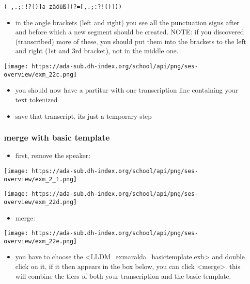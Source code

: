 \documentclass[
  12pt,
]{article}
\providecommand{\tightlist}{%
  \setlength{\itemsep}{0pt}\setlength{\parskip}{0pt}}
\begin{document}
\texttt{(\ \textbar{}{[},.;:!?(){]}\textbar{}{[}a-zäöüß{]}(?={[},.;:?!(){]}))}

\begin{itemize}
\tightlist
\item
  in the angle brackets (left and right) you see all the punctuation
  signs after and before which a new segment should be created. NOTE: if
  you discovered (transcribed) more of these, you should put them into
  the brackets to the left and right (1st and 3rd bracket), not in the
  middle one.
\end{itemize}

\texttt{[image: https://ada-sub.dh-index.org/school/api/png/ses-overview/exm\_22c.png]}

\begin{itemize}
\tightlist
\item
  you should now have a partitur with one transcription line containing
  your text tokenized
\item
  save that transcript, its just a temporary step
\end{itemize}

\hypertarget{merge-with-basic-template}{%
\subsubsection{merge with basic
template}\label{merge-with-basic-template}}

\begin{itemize}
\tightlist
\item
  first, remove the speaker:
\end{itemize}

\texttt{[image: https://ada-sub.dh-index.org/school/api/png/ses-overview/exm\_2\_1.png]}

\texttt{[image: https://ada-sub.dh-index.org/school/api/png/ses-overview/exm\_22d.png]}

\begin{itemize}
\tightlist
\item
  merge:
\end{itemize}

\texttt{[image: https://ada-sub.dh-index.org/school/api/png/ses-overview/exm\_22e.png]}

\begin{itemize}
\tightlist
\item
  you have to choose the
  \textless LLDM\_exmaralda\_basictemplate.exb\textgreater{} and double
  click on it, if it then appears in the box below, you can click
  \textless merge\textgreater. this will combine the tiers of both your
  transcription and the basic template.
\end{itemize}
\end{document}
